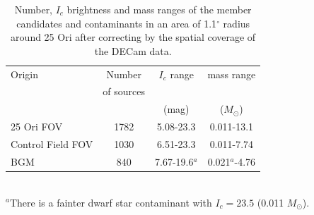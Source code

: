 \documentclass[12pt]{article}
\newcounter{subsubsubsection}[subsubsection]
\begin{document}
\begin{table}
\caption[Number of member candidates and contaminants in our sample.]{Number, $I_c$ brightness and mass ranges of the member candidates and contaminants in an area of 1.1$^\circ$ radius around 25 Ori after correcting by the spatial coverage of the DECam data.}
	\small
	\label{tab_IMF:candidates}
    \setlength{\tabcolsep}{12pt}
	\begin{center}
 	\begin{tabular}{@{}lccc}
 	\hline
 	\hline
 	Origin  	       & Number            & $I_c$ range  & mass range \\ \vspace{-.05in}
					   & of sources        &              &            \\
 	    	   		   & 	        	   & (mag)        & ($M_\odot$)\\
 	\hline
 	25 Ori FOV         & 1782	  		   & 5.08-23.3    & 0.011-13.1   \\
 	Control Field FOV  & 1030 	  		   & 6.51-23.3    & 0.011-7.74     \\ 
 	BGM                & 840   	  		   & 7.67-19.6$^a$& 0.021$^a$-4.76 \\ 
 	\hline
 	\end{tabular}\\
	$^a$There is a fainter dwarf star contaminant with $I_c=23.5$ (0.011 $M_\odot$).
	\end{center}
\end{table}

\label{sec_IMF:extgalcontam}
\end{document}
